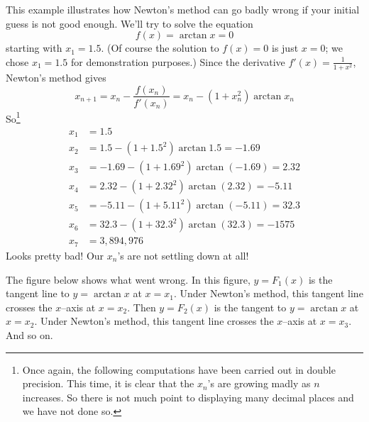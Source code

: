 \begin{eg}\label{eg:NTMbad}
This example illustrates how Newton's method can go badly wrong if your
initial guess is not good enough. We'll try to solve the equation
\begin{equation*}
f(x)=\arctan x=0
\end{equation*}
starting with $x_1=1.5$. (Of course the solution to $f(x)=0$ is just $x=0$; 
we chose $x_1=1.5$ for demonstration purposes.) Since the derivative
$
f'(x)=\frac{1}{1+x^2}
$,
Newton's method gives
\begin{equation*}
x_{n+1}=x_n-\frac{f(x_n)}{f'(x_n)}=x_n-(1+x_n^2)\arctan x_n
\end{equation*}
So\footnote{Once again, the following computations have been carried 
out in double precision. This time, it is clear that the $x_n$'s are 
growing madly as $n$ increases.  So there is not much point to displaying 
many decimal places and we have not done so.}
\begin{align*}
x_1&=1.5\\
x_2&=1.5-(1+1.5^2)\arctan 1.5=-1.69\\
x_3&=-1.69-(1+1.69^2)\arctan (-1.69)=2.32\\
x_4&=2.32-(1+2.32^2)\arctan (2.32)=-5.11\\
x_5&=-5.11-(1+5.11^2)\arctan (-5.11)=32.3\\
x_6&=32.3-(1+32.3^2)\arctan (32.3)=-1575\\
x_7&=3,894,976
\end{align*}
Looks pretty bad! Our $x_n$'s are not settling down at all!

The figure below shows what went wrong. In this figure,
$y=F_1(x)$ is the tangent line to $y=\arctan x$ at $x=x_1$.
Under Newton's method, this tangent line crosses the $x$--axis at $x=x_2$.
Then $y=F_2(x)$ is the tangent to $y=\arctan x$ at $x=x_2$.
Under Newton's method, this tangent line crosses the $x$--axis at $x=x_3$.
And so on. 


\end{eg}
